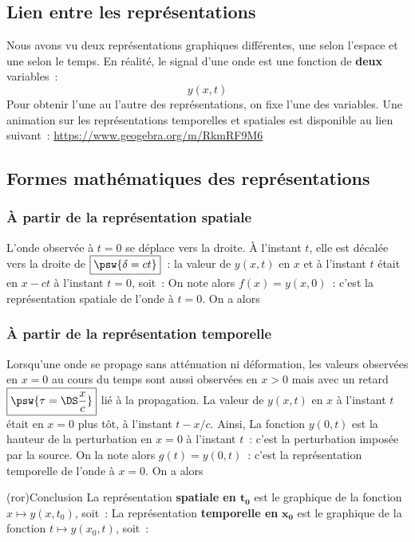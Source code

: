 \documentclass[../../main/main.tex]{subfiles}
\begin{document}
\subsection{Lien entre les représentations}
Nous avons vu deux représentations graphiques différentes, une selon l'espace et
une selon le temps. En réalité, le signal d'une onde est une fonction de
\textbf{deux} variables~:
\[y(x,t)\]
Pour obtenir l'une au l'autre des représentations, on fixe l'une des variables.
Une animation sur les représentations temporelles et spatiales est disponible au
lien suivant~: \url{https://www.geogebra.org/m/RkmRF9M6}

\subsection{Formes mathématiques des représentations}
\subsubsection{À partir de la représentation spatiale}
L'onde observée à $t=0$ se déplace vers la droite. À l'instant $t$, elle est
décalée vers la droite de $\boxed{\psw{\delta = ct}}$~: la valeur de $y(x,t)$
en $x$ et à l'instant $t$ était en $x-ct$ à l'instant $t=0$, soit~:
\psw{
	\[
		y(x,t) = y(x-ct,0)
	\]
}
On note alors $f(x) = y(x,0)$~: c'est la représentation spatiale de l'onde à
$t=0$. On a alors
\psw{
	\[\boxed{
			y(x,t) = f(x-ct)
		}\]
}\vspace{-20pt}
\subsubsection{À partir de la représentation temporelle}

Lorsqu'une onde se propage sans atténuation ni déformation, les valeurs
observées en $x = 0$ au cours du temps sont aussi observées en $x > 0$ mais avec
un retard $\boxed{\psw{\tau = \DS\frac{x}{c}}}$ lié à la propagation.
La valeur de $y(x, t)$ en $x$ à l'instant $t$ était en $x = 0$ plus tôt, à
l'instant $t - x/c$. Ainsi,
\psw{
	\[
		y(x,t) = y\left(0,t-\frac{x}{c}\right)
	\]
}
La fonction $y(0,t)$ est la hauteur de la perturbation en $x=0$ à l'instant
$t$~: c'est la perturbation imposée par la source. On la note alors $g(t) =
	y(0,t)$~: c'est la représentation temporelle de l'onde à $x=0$. On a alors
\psw{
	\[\boxed{
			y(x,t) = g\left(t-\frac{x}{c}\right)
		}\]
}

\begin{tcb}[sidebyside](ror){Conclusion}
	La représentation \textbf{spatiale en $\mathbf{t_0}$} est le graphique de la fonction $x
		\mapsto y(x,t_0)$, soit~:
	\psw{
		\[x\mapsto f(x-ct_0) = g\left(t_0 - \frac{x}{c}\right)\]
	}
	\vspace{-15pt}
	\tcblower
	La représentation \textbf{temporelle en} $\mathbf{x_0}$ est le graphique de la fonction $t
		\mapsto y(x_0,t)$, soit~:
	\psw{
		\[t\mapsto f(x_0-ct) = g\left(t - \frac{x_0}{c}\right)\]
	}
\end{tcb}
\end{document}
